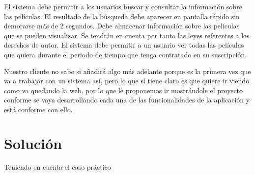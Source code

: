 El sistema debe permitir a los usuarios buscar y consultar la información sobre las películas. El resultado de la búsqueda debe aparecer en pantalla rápido sin demorarse más de 2 segundos. Debe almacenar información sobre las películas que se pueden visualizar. Se tendrán en cuenta por tanto las leyes referentes a los derechos de autor.  El sistema debe permitir a un usuario ver todas las películas que quiera durante el periodo de tiempo que tenga contratado en su suscripción.

Nuestro cliente no sabe si añadirá algo más adelante porque es la primera vez que va a trabajar con un sistema así, pero lo que sí tiene claro es que quiere ir viendo como va quedando la web, por lo que le proponemos ir mostrándole el proyecto conforme se vaya desarrollando cada una de las funcionalidades de la aplicación y está conforme con ello.

\section{Solución}
Teniendo en cuenta el caso práctico

%
%

